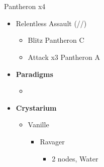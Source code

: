 \chapter[Chapter 4]{}
\begin{multicols}{2}
\renewcommand{\first}{[1] Relentless Assault (\com/\rav/\rav)}

\begin{battle}{Pantheron x4}
\begin{itemize}
    \item \first
    \begin{itemize}
        \item Blitz Pantheron C
        \item Attack x3 Pantheron A
    \end{itemize}
\end{itemize}
\end{battle}

\vfill
\begin{menu}
\begin{itemize}
    \item \textbf{Paradigms}
    \begin{itemize}
        \item {}%
{\paradigmline{\rav}{\rav}{}}%
{\paradigmline{\syn}{\sab}{}}%
{\paradigmline{\rav}{\med}{}}%
{\paradigmline[4]{\textit{\rav}}{\textit{[\sab]}}{}}%
{\paradigmline{[\rav]}{\rav}{}}
    \end{itemize}
    \columnbreak
    \item \textbf{Crystarium}
    \begin{itemize}
        \item Vanille
        \begin{itemize}
            \item Ravager
            \begin{itemize}
                \item 2 nodes, Water
            \end{itemize}
        \end{itemize}
    \end{itemize}
\end{itemize}
\end{menu}

\end{multicols}

